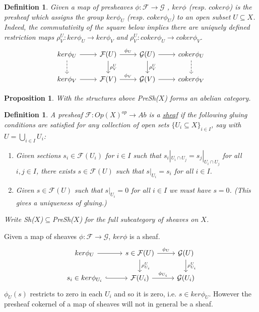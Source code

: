 \documentclass{book}
\newtheorem{prop}[theorem]{Proposition}
\newtheorem{definition}[theorem]{Definition}
\begin{document}
\begin{definition} 
Given a map of presheaves $\phi:\mathcal{F}\rightarrow \mathcal{G}$ , $ker\phi$ (resp. $coker\phi$) is the presheaf which assigns the group $ker\phi_U$ (resp. $coker\phi_U$) to an open subset $U\subseteq X$. Indeed, the commutativity of the square below implies there are uniquely defined restriction maps $\rho_V^U:ker\phi_U \rightarrow ker\phi_V$ and $\rho_V^U:coker\phi_U \rightarrow coker\phi_V$.
$$\begin{tikzcd}
          ker\phi_U \arrow{r} \arrow[d, dashed]&  \mathcal{F}(U) \arrow{r}{\phi_U} \arrow{d}{\rho_V^U}   & \mathcal{G}(U) \arrow{d}{\rho_V^U} \arrow{r} & coker\phi_U \arrow[d, dashed]\\
	ker\phi_V  \arrow{r} & \mathcal{F}(V) \arrow{r}{\phi_V} &  \mathcal{G}(V) \arrow{r} & coker\phi_V
            \end{tikzcd}$$

\end{definition} 

\begin{prop}
With the structures above PreSh($X$) forms an abelian category.
\end{prop}

\begin{definition}
A presheaf $\mathcal{F}:Op(X)^{op} \rightarrow Ab$ is a \underline{sheaf} if the following gluing conditions are satisfied for any collection of open sets $\{U_i \subseteq X\}_{i\in I}$, say with $U=\bigcup_{i \in I}U_i$:
\begin{enumerate}
\item Given sections $s_i \in \mathcal{F}(U_i)$ for $i\in I$ such that $s_i|_{U_i \cap U_j} =s_j|_{U_i \cap U_j}$ for all $i,j\in I$, there exists $s\in \mathcal{F}(U)$ such that $s|_{U_i}=s_i$ for all $i\in I$.
\item Given $s\in \mathcal{F}(U)$ such that $s|_{U_i}=0$ for all $i\in I$ we must have $s=0$. (This gives a uniqueness of gluing.)
\end{enumerate}
Write Sh($X$)$\subseteq$PreSh($X$) for the full subcategory of sheaves on $X$. 
\end{definition}

Given a map of sheaves $\phi: \mathcal{F} \rightarrow \mathcal{G}$, $ker \phi$ is a sheaf.
$$\begin{tikzcd}
          ker\phi_U \arrow{r} & s \in  \mathcal{F}(U) \arrow{r}{\phi_U} \arrow{d}{\rho_{U_i}^U}   & \mathcal{G}(U) \arrow{d}{\rho_{U_i}^U}  \\
	s_i \in ker\phi_{U_i}  \arrow[r, hook] & \mathcal{F}(U_i) \arrow{r}{\phi_{U_i}} &  \mathcal{G}(U_i)  
            \end{tikzcd}$$
$\phi_U (s)$ restricts to zero in each $U_i$ and so it is zero, i.e. $s \in ker \phi_U$. However the presheaf cokernel of a map of sheaves will not in general be a sheaf. 
\end{document}
